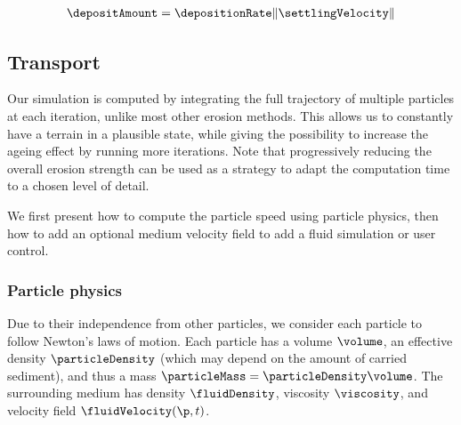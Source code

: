 \begin{align}
    \label{eq:erosion-deltaDepositon}
    \depositAmount = \depositionRate \|\settlingVelocity\|
\end{align}

\subsection{Transport}
Our simulation is computed by integrating the full trajectory of multiple particles at each iteration, unlike most other erosion methods. This allows us to constantly have a terrain in a plausible state, while giving the possibility to increase the ageing effect by running more iterations. 
Note that progressively reducing the overall erosion strength can be used as a strategy to adapt the computation time to a chosen level of detail.

We first present how to compute the particle speed using particle physics, then how to add an optional medium velocity field to add a fluid simulation or user control.


\subsubsection{Particle physics}
Due to their independence from other particles, we consider each particle to follow Newton's laws of motion. Each particle has a volume $\volume$, an effective density $\particleDensity$ (which may depend on the amount of carried sediment), and thus a mass $\particleMass = \particleDensity \volume$. The surrounding medium has density $\fluidDensity$, viscosity $\viscosity$, and velocity field $\fluidVelocity(\p,t)$.

